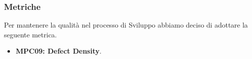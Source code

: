 \subsubsection{Metriche}
Per mantenere la qualità nel processo di Sviluppo abbiamo deciso di adottare la seguente metrica.
\begin{itemize}
    \item \textbf{MPC09: Defect Density}.
\end{itemize}
